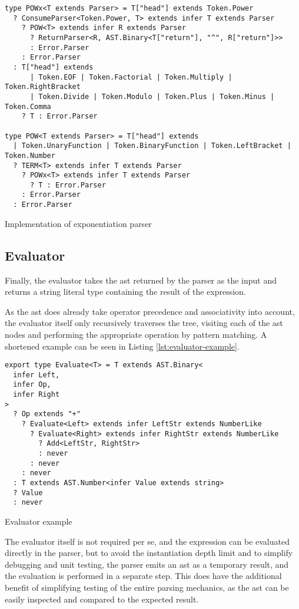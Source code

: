 \begin{listing}[ht]
  \begin{verbatim}
type POWx<T extends Parser> = T["head"] extends Token.Power
  ? ConsumeParser<Token.Power, T> extends infer T extends Parser
    ? POW<T> extends infer R extends Parser
      ? ReturnParser<R, AST.Binary<T["return"], "^", R["return"]>>
      : Error.Parser
    : Error.Parser
  : T["head"] extends
      | Token.EOF | Token.Factorial | Token.Multiply | Token.RightBracket 
      | Token.Divide | Token.Modulo | Token.Plus | Token.Minus | Token.Comma
    ? T : Error.Parser

type POW<T extends Parser> = T["head"] extends
  | Token.UnaryFunction | Token.BinaryFunction | Token.LeftBracket | Token.Number
  ? TERM<T> extends infer T extends Parser
    ? POWx<T> extends infer T extends Parser
      ? T : Error.Parser
    : Error.Parser
  : Error.Parser
\end{verbatim}
  \caption{Implementation of exponentiation parser}\label{lst:pow-parser}
\end{listing}

\clearpage

\subsection{Evaluator}

Finally, the evaluator takes the \acrshort{ast} returned by the parser as the input and returns a string literal type containing the result of the expression.

As the \acrshort{ast} does already take operator precedence and associativity into account, the evaluator itself only recursively traverses the tree, visiting each of the \acrshort{ast} nodes and performing the appropriate operation by pattern matching. A shortened example can be seen in Listing \ref{lst:evaluator-example}.

\begin{listing}[ht]
  \begin{verbatim}
export type Evaluate<T> = T extends AST.Binary<
  infer Left,
  infer Op,
  infer Right
>
  ? Op extends "+"
    ? Evaluate<Left> extends infer LeftStr extends NumberLike
      ? Evaluate<Right> extends infer RightStr extends NumberLike
        ? Add<LeftStr, RightStr>
        : never
      : never
    : never
  : T extends AST.Number<infer Value extends string>
  ? Value
  : never
\end{verbatim}
  \caption{Evaluator example}\label{lst:evaluator-example}
\end{listing}

The evaluator itself is not required per se, and the expression can be evaluated directly in the parser, but to avoid the instantiation depth limit and to simplify debugging and unit testing, the parser emits an \acrshort{ast} as a temporary result, and the evaluation is performed in a separate step. This does have the additional benefit of simplifying testing of the entire parsing mechanics, as the \acrshort{ast} can be easily inspected and compared to the expected result.
